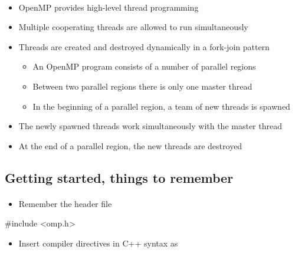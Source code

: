 \documentclass[%
oneside,                 %
final,                   %
10pt]{article}
\begin{document}
\paragraph{}
\begin{itemize}
\item OpenMP provides high-level thread programming

\item Multiple cooperating threads are allowed to run simultaneously

\item Threads are created and destroyed dynamically in a fork-join pattern
\begin{itemize}

   \item An OpenMP program consists of a number of parallel regions

   \item Between two parallel regions there is only one master thread

   \item In the beginning of a parallel region, a team of new threads is spawned

\end{itemize}

\noindent
  \item The newly spawned threads work simultaneously with the master thread

  \item At the end of a parallel region, the new threads are destroyed
\end{itemize}

\noindent



\subsection{Getting started, things to remember}

\paragraph{}
\begin{itemize}
 \item Remember the header file 
\end{itemize}

\noindent
\bcppcod
#include <omp.h>
\ecppcod
\begin{itemize}
 \item Insert compiler directives in C++ syntax as 
\end{itemize}
\end{document}
